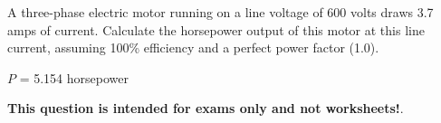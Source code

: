 

A three-phase electric motor running on a line voltage of 600 volts draws 3.7 amps of current.  Calculate the horsepower output of this motor at this line current, assuming 100\% efficiency and a perfect power factor (1.0).







$P$ = 5.154 horsepower







{\bf This question is intended for exams only and not worksheets!}.


